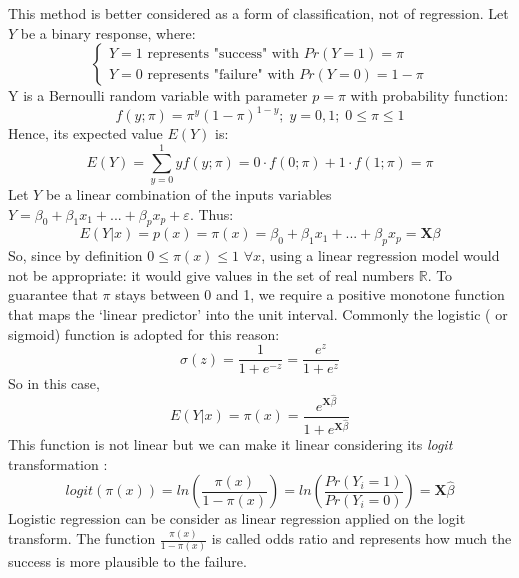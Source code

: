 \documentclass{emulateapj}
\begin{document}
This method is better considered as a form of classification, not of regression.
Let $Y$ be a binary response, where:
\begin{equation}
\begin{cases}
  Y=1   \textrm{ represents "success"     with } Pr(Y=1)=\pi \\
  Y=0  \textrm{ represents "failure"     with } Pr(Y=0)=1-\pi
\end{cases}
\end{equation}
Y is a Bernoulli random variable with parameter $p=\pi$ with probability function:
\begin{equation}
    f(y;\pi)=\pi^y(1-\pi)^{1-y}; \; y=0,1;\; 0\leq\pi\leq1
\end{equation}
Hence, its expected value $E(Y)$ is:
\begin{equation}
E(Y)=\sum_{y=0}^{1}y f(y;\pi)=0\cdot f(0;\pi)+1\cdot f(1;\pi)=\pi
\end{equation}
Let $Y$ be a linear combination of the inputs variables $Y=\beta_0+\beta_1x_1+...+\beta_px_p+\varepsilon$.
Thus:
\begin{equation}
  E(Y|x)=p(x)=\pi(x)=\beta_0+\beta_1x_1+...+\beta_px_p=\boldsymbol{X}\beta
\end{equation}
So, since by definition $0\leq \pi(x) \leq 1 $ $\forall x $, using a linear regression model would not be appropriate: it would give values in the set of real numbers ${\displaystyle \mathbb {R}}$.
To guarantee that $\pi$ stays between 0 and 1, we require a positive monotone function that maps the ‘linear predictor’ into the unit interval.
Commonly the logistic ( or sigmoid) function is adopted for this reason:
\begin{equation}
    \sigma(z)=\frac{1}{1+e^{-z}}=\frac{e^z}{1+e^z}
\end{equation}
So in this case,
\begin{equation}
    E(Y|x)=\pi(x)=\frac{e^{\boldsymbol{X}\hat{\beta}}}{1+e^{\boldsymbol{X}\hat{\beta}}}
\end{equation}
This function is not linear but we can make it linear considering its \textit{logit} transformation :
\begin{equation}
    logit(\pi(x))=ln(\frac{\pi(x)}{1-\pi(x)})=ln(\frac{Pr(Y_i=1)}{Pr(Y_i=0)})=\boldsymbol{X}\hat{\beta}
\end{equation}
Logistic regression can be consider as linear regression applied on the logit transform.
The function $\frac{\pi(x)}{1-\pi(x)}$ is called odds ratio and represents how much the success is more plausible to the failure.
\end{document}
